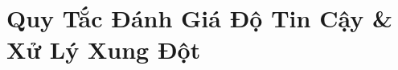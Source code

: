 \documentclass[aspectratio=169, xcolor=table]{beamer}
\begin{document}

\section{Quy Tắc Đánh Giá Độ Tin Cậy \& Xử Lý Xung Đột}
\end{document}
